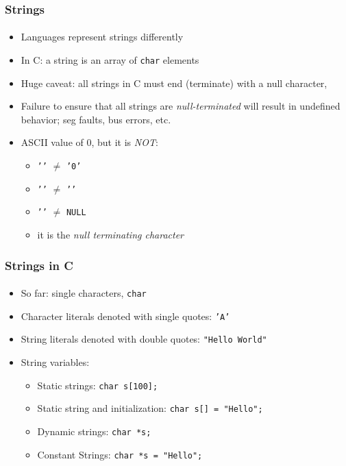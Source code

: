 \documentclass[]{beamer}
\begin{document}
\begin{frame}[fragile]
    \frametitle{Strings}
    \framesubtitle{}

\begin{itemize}[<+->]
  \item Languages represent strings differently  
  \item In C: a string is an array of \texttt{char} elements
  \item \alert{Huge caveat}: all strings in C must end (terminate) with
  a null character, \texttt{\0}
  \item Failure to ensure that all strings are \emph{null-terminated}
  will result in undefined behavior; seg faults, bus errors, etc.
  \item ASCII value of 0, but it is \emph{NOT}:
  \begin{itemize}
    \item \texttt{'\0'} $\neq$ \texttt{'0'}
    \item \texttt{'\0'} $\neq$ \texttt{'\n'}
    \item \texttt{'\0'} $\neq$ \texttt{NULL}
    \item it is the \emph{null terminating character}
  \end{itemize}
\end{itemize}

\end{frame}

\begin{frame}[fragile]
    \frametitle{Strings in C}
    \framesubtitle{}

\begin{itemize}[<+->]
  \item So far: single characters, \texttt{char}
  \item Character literals denoted with single quotes: \texttt{'A'}
  \item String literals denoted with double quotes: \texttt{"Hello World"}
  \item String variables: 
  \begin{itemize}
    \item Static strings: \texttt{char s[100];}
    \item Static string and initialization: \texttt{char s[] = "Hello";}
    \item Dynamic strings: \texttt{char *s;}
    \item Constant Strings: \texttt{char *s = "Hello";} 
  \end{itemize}
\end{itemize}

\end{frame}
\end{document}
